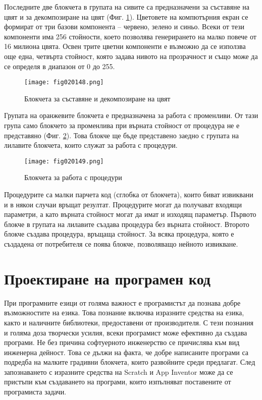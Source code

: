 Последните две блокчета в групата на сивите са предназначени за съставяне на цвят и за декомпозиране на цвят (Фиг. \ref{fig020148}). Цветовете на компютърния екран се формират от три базови компонента – червено, зелено и синьо. Всеки от тези компоненти има 256 стойности, което позволява генерирането на малко повече от 16 милиона цвята. Освен трите цветни компоненти е възможно да се използва още една, четвърта стойност, която задава нивото на прозрачност и също може да се определя в диапазон от 0 до 255.

\begin{figure}[H]
  \centering
  \texttt{[image: fig020148.png]}
  \caption{Блокчета за съставяне и декомпозиране на цвят}
\label{fig020148}
\end{figure}

Групата на оранжевите блокчета е предназначена за работа с променливи. От тази група само блокчето за променлива при върната стойност от процедура не е представяно (Фиг. \ref{fig020149}). Това блокче ще бъде представено заедно с групата на лилавите блокчета, които служат за работа с процедури.

\begin{figure}[H]
  \centering
  \texttt{[image: fig020149.png]}
  \caption{Блокчета за работа с процедури}
\label{fig020149}
\end{figure}

Процедурите са малки парчета код (сглобка от блокчета), които биват извиквани и в някои случаи връщат резултат. Процедурите могат да получават входящи параметри, а като върната стойност могат да имат и изходящ параметър. Първото блокче в групата на лилавите създава процедура без върната стойност. Второто блокче създава процедура, връщаща стойност. За всяка процедура, която е създадена от потребителя се поява блокче, позволяващо нейното извикване.

\section{Проектиране на програмен код}

При програмните езици от голяма важност е програмистът да познава добре възможностите на езика. Това познание включва изразните средства на езика, както и наличните библиотеки, предоставени от производителя. С тези познания и голяма доза творчески усилия, всеки програмист може ефективно да създава програми. Не без причина софтуерното инженерство се причислява към вид инженерна дейност. Това се дължи на факта, че добре написаните програми са подредба на малките градивни блокчета, които развойните среди предлагат. След запознаването с изразните средства на Scratch и App Inventor може да се пристъпи към създаването на програми, които изпълняват поставените от програмиста задачи.

